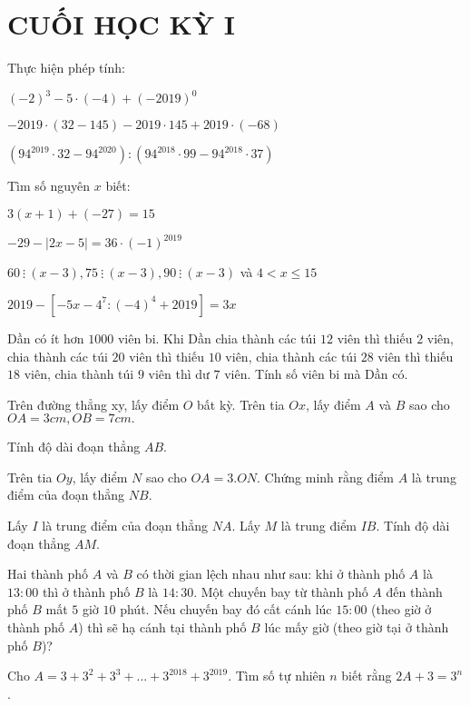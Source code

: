 \section{CUỐI HỌC KỲ I}
\setcounter{ex}{0}
\begin{ex}
	Thực hiện phép tính:
	\begin{listEX}
	\item $(-2)^3-5\cdot(-4)+(-2019)^0$
		\item $-2019\cdot(32-145)-2019\cdot145+2019\cdot(-68)$  
		\item $(94^{2019}\cdot32-94^{2020}):(94^{2018}\cdot99-94^{2018}\cdot 37)$ 
	\end{listEX}
\end{ex}
\begin{ex}
	Tìm số nguyên $x$ biết:
	\begin{listEX}[2]
	\item $3(x+1)+(-27)=15$
		\item $-29-|2x-5|=36\cdot(-1)^{2019}$ 
		\item $60~\vdots~(x-3), 75~\vdots~(x-3), 90~\vdots~(x-3)$ và $ 4<x \leq 15$
		\item $2019-\left[-5x-4^7 :  (-4)^4 +2019 \right]=3x$ 
	\end{listEX}
\end{ex}
\begin{ex}
	Dần có ít hơn $1000$ viên bi. Khi Dần chia thành các túi $12$ viên thì thiếu $2$ viên, chia thành các túi $20$ viên thì thiếu $10$ viên, chia thành các túi $28$ viên thì thiếu $18$ viên, chia thành túi $9$ viên thì dư $7$ viên. Tính số viên bi mà Dần có.
\end{ex}
\begin{ex}
	Trên đường thẳng xy, lấy điểm $O$ bất kỳ. Trên tia $Ox$, lấy điểm $A$ và $B$ sao cho $OA = 3cm, OB = 7cm.$ 
		\begin{listEX}
			\item Tính độ dài đoạn thẳng $AB$.
	\item Trên tia $Oy$, lấy điểm $N$ sao cho $OA = 3.ON$. Chứng minh rằng điểm $A$ là trung điểm của đoạn thẳng $NB$.
	\item Lấy $I$ là trung điểm của đoạn thẳng $NA$. Lấy $M$ là trung điểm $IB$. Tính độ dài đoạn thẳng $AM$.
		\end{listEX}
\end{ex}
\begin{ex}
	Hai thành phố $A$ và $B$ có thời gian lệch nhau như sau: khi ở thành phố $A$ là $13:00$ thì ở thành phố $B$ là $14:30$. Một chuyến bay từ thành phố $A$ đến thành phố $B$ mất $5$ giờ $10$ phút. Nếu chuyến bay đó cất cánh lúc $15:00$ (theo giờ ở thành phố $A$) thì sẽ hạ cánh tại thành phố $B$ lúc mấy giờ (theo giờ tại ở thành phố $B$)?
\end{ex}
\begin{ex}
	Cho $A=3+3^2+3^3+...+3^{2018}+3^{2019}$. Tìm số tự nhiên $n$ biết rằng $2A+3=3^n$.
\end{ex}